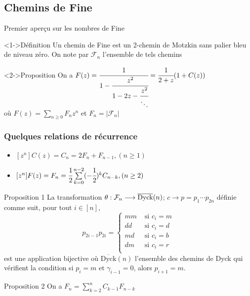 \subsection{Chemins de Fine}
\begin{frame}[t]{Premier aperçu sur les nombres de Fine}
    \transfade
    \begin{block}<1->{Définition}
        Un chemin de Fine est un 2-chemin de Motzkin sans palier bleu de niveau zéro. On note par $\mathcal{F}_{n}$ l'ensemble de tels chemins
    \end{block}
    
    \begin{block}<2->{Proposition}
        On a $F(z)=\cfrac{1}{1-\cfrac{z^2}{1-2z-\cfrac{z^2}{\ddots}}} = \cfrac{1}{2+z}(1+C(z))$\\ 
        \vspace{7pt} où $F(z)=\sum\limits_{n\geq 0}F_{n}z^n$ et $F_{n}=|\mathcal{F}_{n}|$
    \end{block}
\end{frame}

\begin{frame}
    \frametitle{Quelques relations de récurrence}
    \transfade
    \begin{center}
        \begin{itemize}
            \item $[z^{n}]C(z) = C_{n} = 2F_{n} + F_{n-1}, (n\geq 1)$
            \pause
            \item $[z^n]F(z) = F_{n} = \cfrac{1}{2}\sum\limits_{k=0}^{n-2}(-\cfrac{1}{2})^{k}C_{n-k}, (n\geq 2)$
            \pause
        \end{itemize}
    \end{center}
\end{frame}

\begin{frame}
    \transfade
    \begin{block}{Proposition 1}
        La transformation $\theta: \mathcal{F}_{n} \longrightarrow  \overline{\rm{Dyck}}(n)$; $c \longrightarrow p=p_{1}\cdots p_{2n}$ définie comme suit, pour tout $i \in [n]$,
        $$
            p_{2i-1}p_{2i}=\begin{cases}
                mm & \text{ si } c_{i}=m \\
                dd & \text{ si } c_{i}=d \\
                md & \text{ si } c_{i}=b \\
                dm & \text{ si } c_{i}=r \\
            \end{cases}
        $$
        est une application bijective où $\overline{\text{Dyck}}(n)$ l'ensemble des chemins de Dyck qui
        vérifient la condition si $p_{i}=m \text{ et } \gamma_{i-1}=0$, alors  $p_{i+1}=m$.
    \end{block}
    \pause
    \begin{block}{Proposition 2}
        On a $F_{n}=\sum\limits_{k=2}^{n}C_{k-1}F_{n-k}$
    \end{block}
\end{frame}


